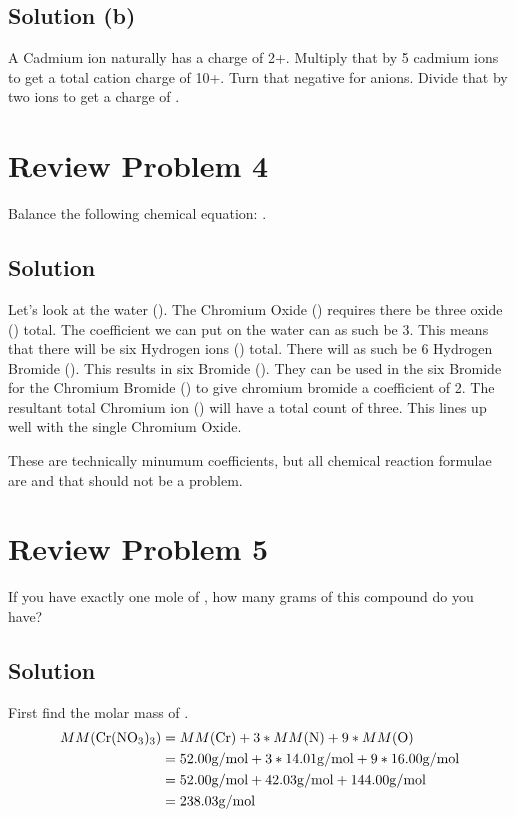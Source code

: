\documentclass[10pt]{article}
\begin{document}
        \subsection{Solution (b)}
            A Cadmium ion naturally has a charge of 2+.
            Multiply that by 5 cadmium ions to get a total cation charge of 10+.
            Turn that negative for anions.
            Divide that by two  ions to get a charge of .

    \pagebreak
    \section{Review Problem 4}
        Balance the following chemical equation: .

        \subsection{Solution}
            Let's look at the water ().
            The Chromium Oxide () requires there be three oxide () total.
            The coefficient we can put on the water can as such be 3.
            This means that there will be six Hydrogen ions () total.
            There will as such be 6 Hydrogen Bromide ().
            This results in six Bromide ().
            They can be used in the six Bromide for the Chromium Bromide () to give chromium bromide a coefficient of 2.
            The resultant total Chromium ion () will have a total count of three.
            This lines up well with the single Chromium Oxide.
            \begin{center}
            \end{center}

            These are technically minumum coefficients, but all chemical reaction formulae are and that should not be a problem.
    
    \pagebreak
    \section{Review Problem 5}
        If you have exactly one mole of , how many grams of this compound do you have?

        \subsection{Solution}
            First find the molar mass of .
            \begin{align}
                MM(\ce{Cr(NO3)3})   &=  MM(\ce{Cr}) + 3 * MM(\ce{N}) + 9 * MM(\ce{O})\\
                    &=  52.00 \unit{\gram/\mol} + 3 * 14.01 \unit{\gram/\mol} + 9 * 16.00 \unit{\gram/\mol}\\
                    &=  52.00 \unit{\gram/\mol} + 42.03 \unit{\gram/\mol} + 144.00 \unit{\gram/\mol}\\
                    &=  238.03 \unit{\gram/\mol}
            \end{align}
\end{document}
